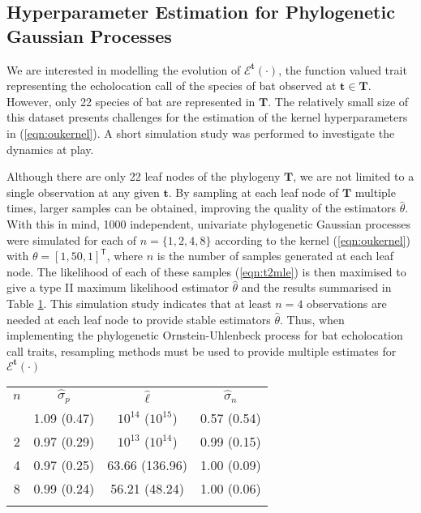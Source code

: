 \documentclass[wsdraft]{ws-rv9x6} %
\begin{document}
\subsection{Hyperparameter Estimation for Phylogenetic Gaussian Processes}

We are interested in modelling the evolution of \(\mathcal{E}^{\mathbf{t}}(\cdot)\), the function valued trait representing the echolocation call of the species of bat observed at \(\mathbf{t} \in \mathbf{T}\). However, only 22 species of bat are represented in \(\mathbf{T}\). The relatively small size of this dataset presents challenges for the estimation of the kernel hyperparameters in (\ref{eqn:oukernel}). A short simulation study was performed to investigate the dynamics at play.

Although there are only 22 leaf nodes of the phylogeny \(\mathbf{T}\), we are not limited to a single observation at any given \(\mathbf{t}\). By sampling at each leaf node of \(\mathbf{T}\) multiple times, larger samples can be obtained, improving the quality of the estimators \(\hat{\theta}\). With this in mind, 1000 independent, univariate phylogenetic Gaussian processes were simulated for each of \(n = \{1,2,4,8\}\) according to the kernel (\ref{eqn:oukernel}) with \(\theta = [1,50,1]^{\mathsf{T}}\), where \(n\) is the number of samples generated at each leaf node. The likelihood of each of these samples (\ref{eqn:t2mle}) is then maximised to give a type II maximum likelihood estimator \(\hat{\theta}\) and the results summarised in Table \ref{tab::ind_simulation}. This simulation study indicates that at least \(n = 4\) observations are needed at each leaf node to provide stable estimators \(\hat{\theta}\). Thus, when implementing the phylogenetic Ornstein-Uhlenbeck process for bat echolocation call traits, resampling methods must be used to provide multiple estimates for \(\mathcal{E}^{\mathbf{t}}(\cdot)\)

\begin{table}[ht]
	{
		\begin{tabular}{@{}cccc@{}} \toprule
			\(n\)  & \(\hat{\sigma}_p \) & \(\hat{\ell}\) & \(\hat{\sigma}_n\) \\
			\colrule
			1 & 1.09 (0.47) & \(10^{14}\) (\(10^{15}\)) & 0.57 (0.54) \\
			2 & 0.97 (0.29) & \(10^{13}\) (\(10^{14}\)) & 0.99 (0.15) \\
			4 & 0.97 (0.25) & 63.66 (136.96) & 1.00 (0.09) \\
			8 & 0.99 (0.24) & 56.21 (48.24) & 1.00 (0.06) \\			
			\botrule
		\end{tabular}
	}
	\label{tab::ind_simulation}
\end{table}




\end{document}
